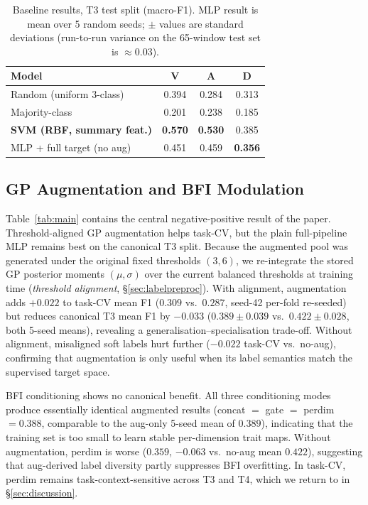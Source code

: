 \documentclass[sigconf,nonacm]{acmart}
\newcommand{\best}[1]{\textbf{\textcolor{bestcol}{#1}}}
\begin{document}
\begin{table}[t]
\caption{Baseline results, T3 test split (macro-F1). MLP result is mean over 5
  random seeds; $\pm$ values are standard deviations (run-to-run variance on the
  65-window test set is ${\approx}0.03$).}
\label{tab:baselines}
\centering
\begin{tabular}{lccc}
\toprule
\textbf{Model} & \textbf{V} & \textbf{A} & \textbf{D} \\
\midrule
Random (uniform 3-class) & 0.394 & 0.284 & 0.313 \\
Majority-class           & 0.201 & 0.238 & 0.185 \\
\best{SVM (RBF, summary feat.)} & \best{0.570} & \best{0.530} & 0.385 \\
MLP + full target (no aug)   & 0.451 & 0.459 & \best{0.356} \\
\bottomrule
\end{tabular}
\end{table}

\subsection{GP Augmentation and BFI Modulation}
\label{sec:mainresults}

Table~\ref{tab:main} contains the central negative-positive result of the
paper.
Threshold-aligned GP augmentation helps task-CV, but the plain full-pipeline MLP
remains best on the canonical T3 split.
Because the augmented pool was generated under the original fixed thresholds
$(3, 6)$, we re-integrate the stored GP posterior moments $(\mu, \sigma)$ over
the current balanced thresholds
at training time (\emph{threshold alignment}, §\ref{sec:labelpreproc}).
With alignment, augmentation adds $+0.022$ to task-CV mean F1
($0.309$ vs.\ $0.287$, seed-42 per-fold re-seeded) but reduces canonical T3
mean F1 by $-0.033$ ($0.389 \pm 0.039$ vs.\ $0.422 \pm 0.028$, both 5-seed
means), revealing a generalisation--specialisation trade-off.
Without alignment, misaligned soft labels hurt further
($-0.022$ task-CV vs.\ no-aug), confirming that augmentation is only useful
when its label semantics match the supervised target space.

BFI conditioning shows no canonical benefit.
All three conditioning modes produce essentially identical augmented results
(concat $=$ gate $=$ perdim $= 0.388$, comparable to the aug-only 5-seed mean
of $0.389$), indicating that the training set is too small to learn stable
per-dimension trait maps.
Without augmentation, perdim is worse ($0.359$, $-0.063$ vs.\ no-aug
mean $0.422$), suggesting that aug-derived label diversity partly suppresses
BFI overfitting.
In task-CV, perdim remains task-context-sensitive across T3 and T4, which we
return to in §\ref{sec:discussion}.
\end{document}
